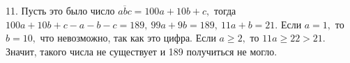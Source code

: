 11. Пусть это было число $\overline{abc}=100a+10b+c,$ тогда $100a+10b+c-a-b-c=189,\ 99a+9b=189,\ 11a+b=21.$ Если $a=1,$ то $b=10,$ что невозможно, так как это цифра. Если $a\geqslant2,$ то $11a\geqslant22>21.$ Значит, такого числа не существует и 189 получиться не могло.\\
